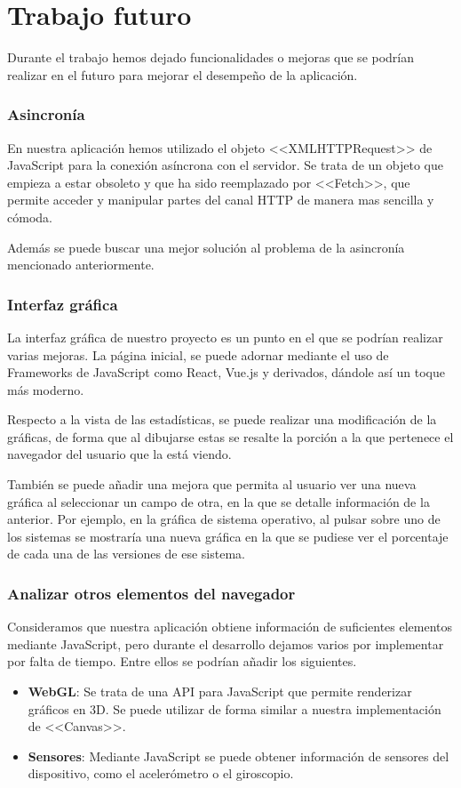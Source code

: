 \section{Trabajo futuro}
Durante el trabajo hemos dejado funcionalidades o mejoras que se podrían realizar en el futuro para mejorar el desempeño de la aplicación.
\subsubsection{Asincronía}
En nuestra aplicación hemos utilizado el objeto <<XMLHTTPRequest>> de JavaScript para la conexión asíncrona con el servidor. Se trata de un objeto que empieza a estar obsoleto y que ha sido reemplazado por <<Fetch>>, que permite acceder y manipular partes del canal HTTP de manera mas sencilla y cómoda.\par 
Además se puede buscar una mejor solución al problema de la asincronía mencionado anteriormente.
\subsubsection{Interfaz gráfica}
La interfaz gráfica de nuestro proyecto es un punto en el que se podrían realizar varias mejoras. La página inicial, se puede adornar mediante el uso de Frameworks de JavaScript como React, Vue.js y derivados, dándole así un toque más moderno. \par 
Respecto a la vista de las estadísticas, se puede realizar una modificación de la gráficas, de forma que al dibujarse estas se resalte la porción a la que pertenece el navegador del usuario que la está viendo.\par 
También se puede añadir una mejora que permita al usuario ver una nueva gráfica al seleccionar un campo de otra, en la que se detalle información de la anterior. Por ejemplo, en la gráfica de sistema operativo, al pulsar sobre uno de los sistemas se mostraría una nueva gráfica en la que se pudiese ver el porcentaje de cada una de las versiones de ese sistema.
\subsubsection{Analizar otros elementos del navegador}
Consideramos que nuestra aplicación obtiene información de suficientes elementos mediante JavaScript, pero durante el desarrollo dejamos varios por implementar por falta de tiempo. Entre ellos se podrían añadir los siguientes.
\begin{itemize}
    \item \textbf{WebGL}: Se trata de una API para JavaScript que permite renderizar gráficos en 3D. Se puede utilizar de forma similar a nuestra implementación de <<Canvas>>.
    \item \textbf{Sensores}: Mediante JavaScript se puede obtener información de sensores del dispositivo, como el acelerómetro o el giroscopio.
\end{itemize}
